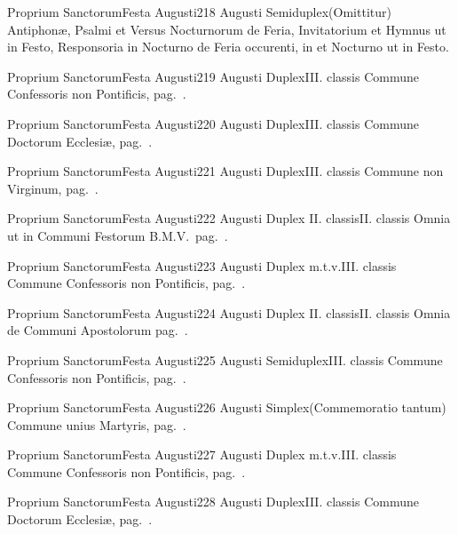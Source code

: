 \documentclass[nocturnale-romanum.tex]{subfiles}
\begin{document}
	{Proprium Sanctorum}{Festa Augusti}{2}{18 Augusti}
	{Semiduplex}{(Omittitur)}
	{Antiphonæ, Psalmi et Versus Nocturnorum de Feria, Invitatorium et Hymnus ut in Festo, Responsoria in  Nocturno de Feria occurenti, in  et  Nocturno ut in Festo.}
	{}

	{Proprium Sanctorum}{Festa Augusti}{2}{19 Augusti}
	{Duplex}{III. classis}
	{Commune Confessoris non Pontificis, pag.\ \pageref{M-CONP}.}
	{}

	{Proprium Sanctorum}{Festa Augusti}{2}{20 Augusti}
	{Duplex}{III. classis}
	{Commune Doctorum Ecclesiæ, pag.\ \pageref{M-CODO}.}
	{}

	{Proprium Sanctorum}{Festa Augusti}{2}{21 Augusti}
	{Duplex}{III. classis}
	{Commune non Virginum, pag.\ \pageref{M-MU}.}
	{}

	{Proprium Sanctorum}{Festa Augusti}{2}{22 Augusti}
	{Duplex II. classis}{II. classis}
	{Omnia ut in Communi Festorum B.M.V.\ pag.\ \pageref{M-CBMV}.}
	{}

	{Proprium Sanctorum}{Festa Augusti}{2}{23 Augusti}
	{Duplex m.t.v.}{III. classis}
	{Commune Confessoris non Pontificis, pag.\ \pageref{M-CONP}.}
	{}

	{Proprium Sanctorum}{Festa Augusti}{2}{24 Augusti}
	{Duplex II. classis}{II. classis}
	{Omnia de Communi Apostolorum pag.\ \pageref{M-APEX}.}
	{}

	{Proprium Sanctorum}{Festa Augusti}{2}{25 Augusti}
	{Semiduplex}{III. classis}
	{Commune Confessoris non Pontificis, pag.\ \pageref{M-CONP}.}
	{}

	{Proprium Sanctorum}{Festa Augusti}{2}{26 Augusti}
	{Simplex}{(Commemoratio tantum)}
	{Commune unius Martyris, pag.\ \pageref{M-UMEX}.}
	{}

	{Proprium Sanctorum}{Festa Augusti}{2}{27 Augusti}
	{Duplex m.t.v.}{III. classis}
	{Commune Confessoris non Pontificis, pag.\ \pageref{M-CONP}.}
	{}

	{Proprium Sanctorum}{Festa Augusti}{2}{28 Augusti}
	{Duplex}{III. classis}
	{Commune Doctorum Ecclesiæ, pag.\ \pageref{M-CODO}.}
	{}
\end{document}
